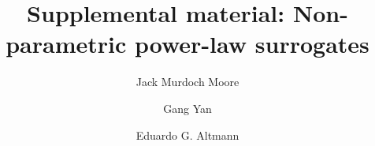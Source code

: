 \documentclass[%
prx,
reprint,
superscriptaddress,
nofootinbib,
 amsmath,amssymb,
 aps,
]{revtex4-2}
\def\jmm#1{{\color{greencolour} JMM: #1}}
\begin{document}
\makeatletter
\@fpsep\textheight
\makeatother


\renewcommand{\theequation}{S\arabic{equation}}\renewcommand{\thefigure}{S\arabic{figure}}
\makeatletter
\def\@biblabel#1{[S#1]}
\makeatother
\newcommand{\scite}[1]{\textrm{[S\citealp{#1}]}}



\title{Supplemental material: Non-parametric power-law surrogates}

\author{Jack Murdoch Moore}
\author{Gang Yan}%
\author{Eduardo G. Altmann}%


\begin{abstract}
\end{abstract}

\maketitle


\end{document}
